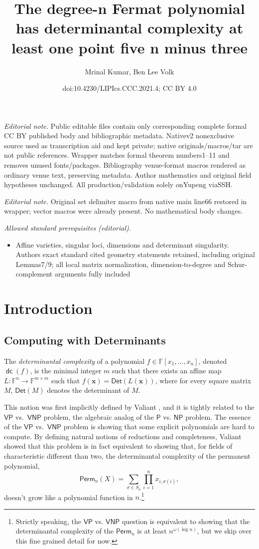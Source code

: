 \documentclass[10pt,a4paper]{article}
\title{The degree-n Fermat polynomial has determinantal complexity at least one point five n minus three}
\author{Mrinal Kumar, Ben Lee Volk}
\date{doi:10.4230/LIPIcs.CCC.2021.4; CC BY 4.0}
\newcommand{\VP}{\mathsf{VP}}
\newcommand{\VNP}{\mathsf{VNP}}
\renewcommand{\P}{\mathsf{P}}
\newcommand{\NP}{\mathsf{NP}}
\newcommand{\F}{\mathbb{F}}
\newcommand{\vx}{\mathbf{x}}
\newcommand{\Perm}{\mathsf{Perm}}
\newcommand{\Det}{\mathsf{Det}}
\DeclareMathOperator{\dc}{\mathsf{dc}}
\begin{document}
\maketitle
\noindent\textit{Editorial note.} Public editable files contain only corresponding complete formal CC BY published body and bibliographic metadata. Nativev2 nonexclusive source used as transcription aid and kept private; native originals/macros/tar are not public references. Wrapper matches formal theorem numbers1–11 and removes unused fonts/packages. Bibliography venue-format macros rendered as ordinary venue text, preserving metadata. Author mathematics and original field hypotheses unchanged. All production/validation solely onYupeng viaSSH.\par\medskip
\noindent\textit{Editorial note.} Original set delimiter macro from native main line66 restored in wrapper; vector macros were already present. No mathematical body changes.\par\medskip
\noindent\textit{Allowed standard prerequisites (editorial).}\begin{itemize}
\item Affine varieties, singular loci, dimensions and determinant singularity. Authors exact standard cited geometry statements retained, including original Lemmas7/9; all local matrix normalization, dimension-to-degree and Schur-complement arguments fully included
\end{itemize}\medskip
\section{Introduction}

\subsection{Computing with Determinants}
The \emph{determinantal complexity} of a polynomial $f \in \F[x_1, \ldots, x_n]$, denoted $\dc(f)$, is the minimal integer $m$ such that there exists an affine map $L : \F^n \to \F^{m \times m}$ such that $f(\vx) = \mathsf{Det}(L(\vx))$, where for every square matrix $M$, $\Det(M)$ denotes the determinant of $M$.

This notion was first implicitly defined by Valiant \cite{V79}, and it is tightly related to the $\VP$ vs.\ $\VNP$ problem, the algebraic analog of the $\P$ vs. $\NP$ problem. The essence of the $\VP$ vs.\ $\VNP$ problem is showing that some explicit polynomials are hard to compute. By defining natural notions of reductions and completeness, Valiant showed that this problem is in fact equivalent to showing that, for fields of characteristic different than two, the determinantal complexity of the permanent polynomial,
\[
\Perm_n(X)  = \sum_{\sigma \in S_n} \prod_{i=1}^n x_{i,\sigma(i)},
\]
doesn't grow like a polynomial function in $n.$\footnote{Strictly speaking, the $\VP$ vs. $\VNP$ question is equivalent to showing that the determinantal complexity of the $\Perm_n$ is at least $n^{\omega(\log n)}$, but we skip over this fine grained detail for now.}
\end{document}
